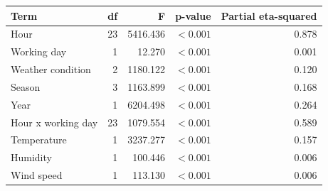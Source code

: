 \begin{tabular}{lrrlr}
\toprule
Term & df & F & p-value & Partial eta-squared \\
\midrule
Hour & 23 & 5416.436 & $<0.001$ & 0.878 \\
Working day & 1 & 12.270 & $<0.001$ & 0.001 \\
Weather condition & 2 & 1180.122 & $<0.001$ & 0.120 \\
Season & 3 & 1163.899 & $<0.001$ & 0.168 \\
Year & 1 & 6204.498 & $<0.001$ & 0.264 \\
Hour x working day & 23 & 1079.554 & $<0.001$ & 0.589 \\
Temperature & 1 & 3237.277 & $<0.001$ & 0.157 \\
Humidity & 1 & 100.446 & $<0.001$ & 0.006 \\
Wind speed & 1 & 113.130 & $<0.001$ & 0.006 \\
\bottomrule
\end{tabular}
